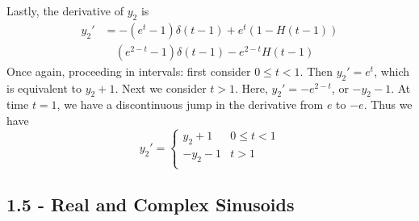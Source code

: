 \documentclass[a4paper]{article}
\begin{document}
Lastly, the derivative of \(y_{2}\) is
\begin{align*}
	y_{2}' & = -\!\left( e^{t} - 1 \right) \delta \!\left( t - 1 \right) + e^{t} \!\left( 1 - H \!\left( t - 1 \right)  \right) \\
	       & \quad \!\left( e^{2-t} - 1 \right) \delta \!\left( t - 1 \right) - e^{2 - t} H \!\left( t - 1 \right) 
\end{align*}
Once again, proceeding in intervals: first consider \(0 \le t < 1\). Then \(y_{2}' = e^{t}\), which is equivalent to \(y_{2} + 1\). Next we consider \(t > 1\). Here, \(y_{2}' = -e^{2 - t}\), or \(-y_{2} - 1\). At time \(t = 1\), we have a discontinuous jump in the derivative from \(e\) to \(-e\). Thus we have
\[
	y_{2}' = \begin{cases}
		y_{2} + 1 & 0 \le t < 1  \\
		- y_{2} - 1 & t > 1 \\
	\end{cases}
\]

\newpage
\subsection{\textsf{1.5 - Real and Complex Sinusoids}}
\end{document}
